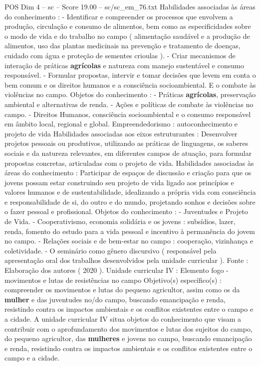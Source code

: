 \begin{textsample}{POS Dim 4 – sc – Score 19.00 – sc/sc\_em\_76.txt}
Habilidades associadas às áreas do conhecimento : - Identificar e compreender os processos que envolvem a produção, circulação e consumo de alimentos, bem como as especificidades sobre o modo de vida e do trabalho no campo ( alimentação saudável e a produção de alimentos, uso das plantas medicinais na prevenção e tratamento de doenças, cuidado com água e proteção de sementes crioulas ). - Criar mecanismos de interação de práticas \textbf{agrícolas} e natureza com manejo sustentável e consumo responsável. - Formular propostas, intervir e tomar decisões que levem em conta o bem comum e os direitos humanos e a consciência socioambiental.
E o combate às violências no campo.
Objetos do conhecimento : - Práticas \textbf{agrícolas}, preservação ambiental e alternativas de renda. - Ações e políticas de combate às violências no campo. - Direitos Humanos, consciência socioambiental e o consumo responsável em âmbito local, regional e global.
Empreendedorismo : autoconhecimento e projeto de vida Habilidades associadas aos eixos estruturantes : Desenvolver projetos pessoais ou produtivos, utilizando as práticas de linguagens, os saberes sociais e da natureza relevantes, em diferentes campos de atuação, para formular propostas concretas, articuladas com o projeto de vida.
Habilidades associadas às áreas do conhecimento : Participar de espaços de discussão e criação para que os jovens possam estar construindo seu projeto de vida ligado aos princípios e valores humanos e de sustentabilidade, idealizando a própria vida com consciência e responsabilidade de si, do outro e do mundo, projetando sonhos e decisões sobre o fazer pessoal e profissional.
Objetos do conhecimento : - Juventudes e Projeto de Vida. - Cooperativismo, economia solidária e os jovens : subsídios, lazer, renda, fomento do estudo para a vida pessoal e incentivo à permanência do jovem no campo. - Relações sociais e de bem-estar no campo : cooperação, vizinhança e coletividade. - O seminário como gênero discursivo ( responsável pela apresentação oral dos trabalhos desenvolvidos pela unidade curricular ).
Fonte : Elaboração dos autores ( 2020 ).
Unidade curricular IV : Elemento fogo - movimentos e lutas de resistências no campo Objetivo(s) específico(s) : compreender os movimentos e lutas do pequeno agricultor, assim como os da \textbf{mulher} e das juventudes no/do campo, buscando emancipação e renda, resistindo contra os impactos ambientais e os conflitos existentes entre o campo e a cidade.
A unidade curricular IV situa objetos do conhecimento que visam a contribuir com o aprofundamento dos movimentos e lutas dos sujeitos do campo, do pequeno agricultor, das \textbf{mulheres} e jovens no campo, buscando emancipação e renda, resistindo contra os impactos ambientais e os conflitos existentes entre o campo e a cidade.

\end{textsample}
